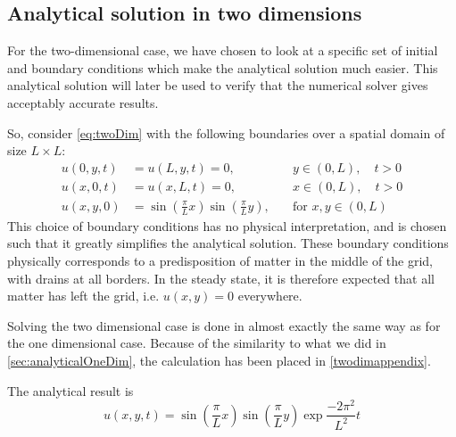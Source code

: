 \subsection{Analytical solution in two dimensions}
For the two-dimensional case, we have chosen to look at a specific set of initial and boundary conditions which make the analytical solution much easier. This analytical solution will later be used to verify that the numerical solver gives acceptably accurate results.

So, consider \vref{eq:twoDim} with the following boundaries over a spatial domain of size \(L \times L\):
\begin{equation} \label{eq:twoDimBoundaries}
\begin{aligned}
u(0,y,t) &= u(L,y,t) = 0, \quad &y \in (0,L),\quad t > 0 \\
u(x,0,t) &= u(x,L,t) = 0, \quad &x \in (0,L),\quad t > 0 \\
u(x,y,0) &= \sin(\frac{\pi}{L}x)\sin(\frac{\pi}{L}y), \quad&\text{for }x,y\in (0,L)
\end{aligned}
\end{equation}
This choice of boundary conditions has no physical interpretation, and is chosen such that it greatly simplifies the analytical solution. These boundary conditions physically corresponds to a predisposition of matter in the middle of the grid, with drains at all borders. In the steady state, it is therefore expected that all matter has left the grid, i.e. \(u(x,y)=0\) everywhere.

Solving the two dimensional case is done in almost exactly the same way as for the one dimensional case. Because of the similarity to what we did in \vref{sec:analyticalOneDim}, the calculation has been placed in \ref{twodimappendix}.

The analytical result is
\begin{equation} \label{eq:analyticalSolutionTwoDim}
u(x,y,t) = \sin(\frac{\pi}{L}x)\sin(\frac{\pi}{L}y)\exp{\frac{-2\pi^2}{L^2}t}
\end{equation}
